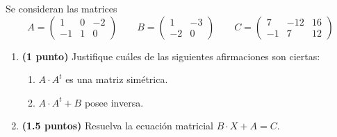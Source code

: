 
Se consideran las matrices
\[
  A=\begin{pmatrix}1&0&-2\\-1&1&0\end{pmatrix}
  \qquad
  B=\begin{pmatrix}1&-3\\-2&0\end{pmatrix}
  \qquad
  C=\begin{pmatrix}7&-12&16\\-1&7&12\end{pmatrix}
\]

\begin{enumerate}[label=\alph*)]
  \item \textbf{(1 punto)} Justifique cuáles de las siguientes afirmaciones
  son ciertas:
  \begin{enumerate}[label=\arabic*)]
    \item $A\cdot A^{t}$ es una matriz simétrica.
    \item $A\cdot A^{t}+B$ posee inversa.
  \end{enumerate}
  \item \textbf{(1.5 puntos)} Resuelva la ecuación matricial $B\cdot X+A=C$.
\end{enumerate}
